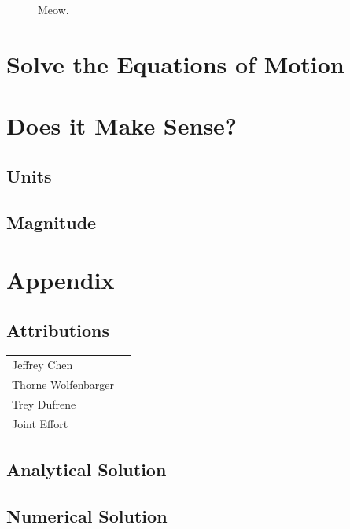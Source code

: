 \documentclass[12pt]{report}
\begin{document}
\begin{flushleft}
\begin{figure}[ht]
  \caption{Meow.}
\end{figure}
\section{Solve the Equations of Motion}

\section{Does it Make Sense?}
\subsection{Units}

\subsection{Magnitude}

\section{Appendix} \label{appendix}

\subsection{Attributions}

\onehalfspacing
\begin{tabular}{ll}
Jeffrey Chen & \\
Thorne Wolfenbarger & \\
Trey Dufrene & \\
Joint Effort &
\end{tabular}
\singlespacing

\subsection{Analytical Solution}

\subsection{Numerical Solution} \label{appendix:numerical}


\end{flushleft}
\end{document}
